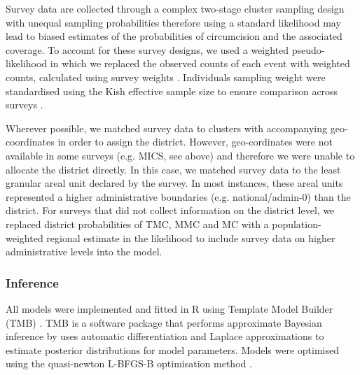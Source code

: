 \documentclass{article}
\begin{document}
Survey data are collected through a complex two-stage cluster sampling design with unequal sampling probabilities therefore using a standard likelihood may lead to biased estimates of the probabilities of circumcision and the associated coverage. To account for these survey designs, we used a weighted pseudo-likelihood in which we replaced the observed counts of each event with weighted counts, calculated using survey weights \cite{thomas2024substantial}. Individuals sampling weight were standardised using the Kish effective sample size to ensure comparison across surveys \cite{kish1965survey}.

Wherever possible, we matched survey data to clusters with accompanying geo-coordinates in order to assign the district. However, geo-cordinates were not available in some surveys (e.g. MICS, see above) and therefore we were unable to allocate the district directly. In this case, we matched survey data to the least granular areal unit declared by the survey. In most instances, these areal units represented a higher administrative boundaries (e.g. national/admin-0) than the district. For surveys that did not collect information on the district level, we replaced district probabilities of TMC, MMC and MC with a population-weighted regional estimate in the likelihood to include survey data on higher administrative levels into the model. 


\subsubsection*{Inference}


All models were implemented and fitted in R \cite{rcore} using Template Model Builder (TMB) \cite{kristensen2016tmb}. TMB is a software package that performs approximate Bayesian inference by uses automatic differentiation and Laplace approximations to estimate posterior distributions for model parameters. Models were optimised using the quasi-newton L-BFGS-B optimisation method \cite{byrd1995limited}.
\end{document}
